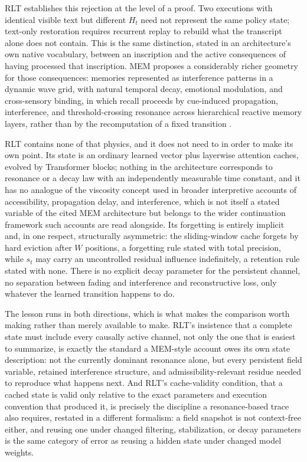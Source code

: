 \documentclass[11pt]{article}
\begin{document}
RLT establishes this rejection at the level of a proof. Two executions with identical visible text but different $H_t$ need not represent the same policy state; text-only restoration requires recurrent replay to rebuild what the transcript alone does not contain. This is the same distinction, stated in an architecture's own native vocabulary, between an inscription and the active consequences of having processed that inscription. MEM proposes a considerably richer geometry for those consequences: memories represented as interference patterns in a dynamic wave grid, with natural temporal decay, emotional modulation, and cross-sensory binding, in which recall proceeds by cue-induced propagation, interference, and threshold-crossing resonance across hierarchical reactive memory layers, rather than by the recomputation of a fixed transition \cite{chenoweth2025mem8}.

RLT contains none of that physics, and it does not need to in order to make its own point. Its state is an ordinary learned vector plus layerwise attention caches, evolved by Transformer blocks; nothing in the architecture corresponds to resonance or a decay law with an independently measurable time constant, and it has no analogue of the viscosity concept used in broader interpretive accounts of accessibility, propagation delay, and interference, which is not itself a stated variable of the cited MEM architecture but belongs to the wider continuation framework such accounts are read alongside. Its forgetting is entirely implicit and, in one respect, structurally asymmetric: the sliding-window cache forgets by hard eviction after $W$ positions, a forgetting rule stated with total precision, while $s_t$ may carry an uncontrolled residual influence indefinitely, a retention rule stated with none. There is no explicit decay parameter for the persistent channel, no separation between fading and interference and reconstructive loss, only whatever the learned transition happens to do.

The lesson runs in both directions, which is what makes the comparison worth making rather than merely available to make. RLT's insistence that a complete state must include every causally active channel, not only the one that is easiest to summarize, is exactly the standard a MEM-style account owes its own state description: not the currently dominant resonance alone, but every persistent field variable, retained interference structure, and admissibility-relevant residue needed to reproduce what happens next. And RLT's cache-validity condition, that a cached state is valid only relative to the exact parameters and execution convention that produced it, is precisely the discipline a resonance-based trace also requires, restated in a different formalism: a field snapshot is not context-free either, and reusing one under changed filtering, stabilization, or decay parameters is the same category of error as reusing a hidden state under changed model weights.
\end{document}
